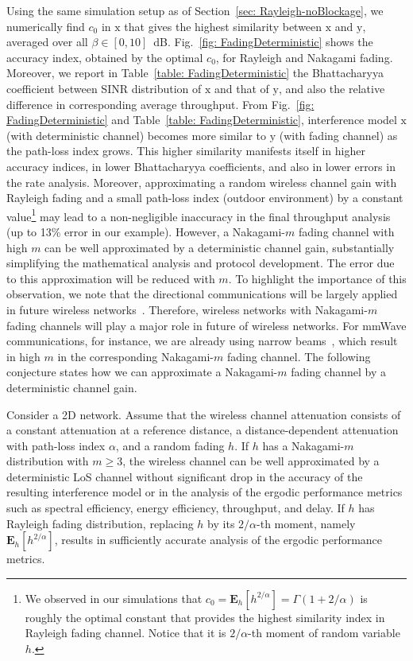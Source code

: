 \documentclass[12pt, draftclsnofoot, onecolumn]{IEEEtran}
\begin{document}
Using the same simulation setup as of Section~\ref{sec: Rayleigh-noBlockage}, we numerically find $c_0$ in $\mathrm{x}$ that gives the highest similarity between $\mathrm{x}$ and $\mathrm{y}$, averaged over all $\beta \in [0,10]$~dB. Fig.~\ref{fig: FadingDeterministic} shows the accuracy index, obtained by the optimal $c_0$, for Rayleigh and Nakagami fading. Moreover, we report in Table~\ref{table: FadingDeterministic} the Bhattacharyya coefficient between SINR distribution of $\mathrm{x}$ and that of $\mathrm{y}$, and also the relative difference in corresponding average throughput. From Fig.~\ref{fig: FadingDeterministic} and Table~\ref{table: FadingDeterministic}, interference model $\mathrm{x}$ (with deterministic channel) becomes more similar to $\mathrm{y}$ (with fading channel) as the path-loss index grows. This higher similarity manifests itself in higher accuracy indices, in lower Bhattacharyya coefficients, and also in lower errors in the rate analysis. Moreover, approximating a random wireless channel gain with Rayleigh fading and a small path-loss index (outdoor environment) by a constant value\footnote{We observed in our simulations that $c_0 = \mathbf{E}_h[h^{2/\alpha}] = \Gamma(1+2/\alpha)$ is roughly the optimal constant that provides the highest similarity index in Rayleigh fading channel. Notice that it is $2/\alpha$-th moment of random variable $h$.} may lead to a non-negligible inaccuracy in the final throughput analysis (up to 13\% error in our example). However, a Nakagami-$m$ fading channel with high $m$ can be well approximated by a deterministic channel gain, substantially simplifying the mathematical analysis and protocol development. The error due to this approximation will be reduced with $m$. To highlight the importance of this observation, we note that the directional communications will be largely applied in future wireless networks~\cite{boccardi2014Five}. Therefore, wireless networks with Nakagami-$m$ fading channels will play a major role in future of wireless networks. For mmWave communications, for instance, we are already using narrow beams~\cite{shokri2015mmWavecellular,Yaghoubi2016Mitigation}, which result in high $m$ in the corresponding Nakagami-$m$ fading channel. The following conjecture states how we can approximate a Nakagami-$m$ fading channel by a deterministic channel gain.

\begin{conjecture}
Consider a 2D network. Assume that the wireless channel attenuation consists of a constant attenuation at a reference distance, a distance-dependent attenuation with path-loss index $\alpha$, and a random fading $h$. If $h$ has a Nakagami-$m$ distribution with $m \geq 3$, the wireless channel can be well approximated by a deterministic LoS channel without significant drop in the accuracy of the resulting interference model or in the analysis of the ergodic performance metrics such as spectral efficiency, energy efficiency, throughput, and delay. If $h$ has Rayleigh fading distribution, replacing $h$ by its $2/\alpha$-th moment, namely $\mathbf{E}_h[h^{2/\alpha}]$, results in sufficiently accurate analysis of the ergodic performance metrics.
\end{conjecture}
\end{document}
